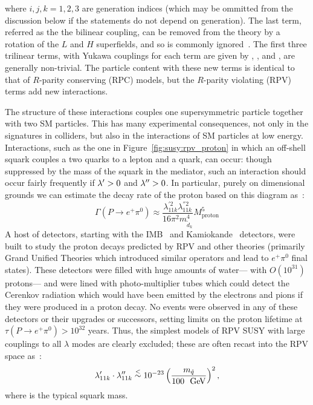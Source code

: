 \noindent where $i,j,k=1,2,3$ are generation indices (which may be ommitted from the discussion below if the statements do not depend on generation). The last term, referred as the the bilinear coupling, can be removed from the theory by a rotation of the $L$ and $H$ superfields, and so is commonly ignored~\cite{dreinerRPV}. The first three trilinear terms, with Yukawa couplings for each term are given by \lam, \lamp, and \lampp, are generally non-trivial. The particle content with these new terms is identical to that of $R$-parity conserving (RPC) models, but the $R$-parity violating (RPV) terms add new interactions.

The structure of these interactions couples one supersymmetric particle together with two SM particles. This has many experimental consequences, not only in the signatures in colliders, but also in the interactions of SM particles at low energy. Interactions, such as the one in Figure~\ref{fig:susy:rpv_proton} in which an off-shell squark couples a two quarks to a lepton and a quark, can occur: though suppressed by the mass of the squark in the mediator, such an interaction should occur fairly frequently if $\lambda^{\prime} > 0$ and $\lambda^{\prime\prime} > 0$. In particular, purely on dimensional grounds we can estimate the decay rate of the proton based on this diagram as~\cite{dreinerRPV}:
%
\begin{equation}
\Gamma(P\rightarrow e^+ \pi^0) \approx \frac{\lambda_{11k}^{'2} \lambda_{11k}^{''2}}{16\pi^2 m^4_{\tilde{d}_k}} M_\mathrm{proton}^5
\end{equation} 
%
A host of detectors, starting with the IMB~\cite{Gajewski:1989gh} and Kamiokande~\cite{Regis:2012sn} detectors, were built to study the proton decays predicted by RPV and other theories (primarily Grand Unified Theories which introduced similar operators and lead to $e^+ \pi^0$ final states). These detectors were filled with huge amounts of water--- with $O(10^{31})$ protons--- and were lined with photo-multiplier tubes which could detect the Cerenkov radiation which would have been emitted by the electrons and pions if they were produced in a proton decay. No events were observed in any of these detectors or their upgrades or successors, setting limits on the proton lifetime at $\tau(P\rightarrow e^+ \pi^0) > 10^{32}$ years. Thus, the simplest models of RPV SUSY with large couplings to all $\lambda$ modes are clearly excluded; these are often recast into the RPV space as~\cite{PhysRevD47279}:
%
\begin{eqnarray}
  \lamp_{11k}\cdot\lampp_{11k}\; \lsim\; 10^{-23} \left( \frac{{\msquark}} {100~\gev} \right)^2,
  \label{eqn:rpvandudd:protondecay}
\end{eqnarray}
%
where \msquark is the typical squark mass. 

